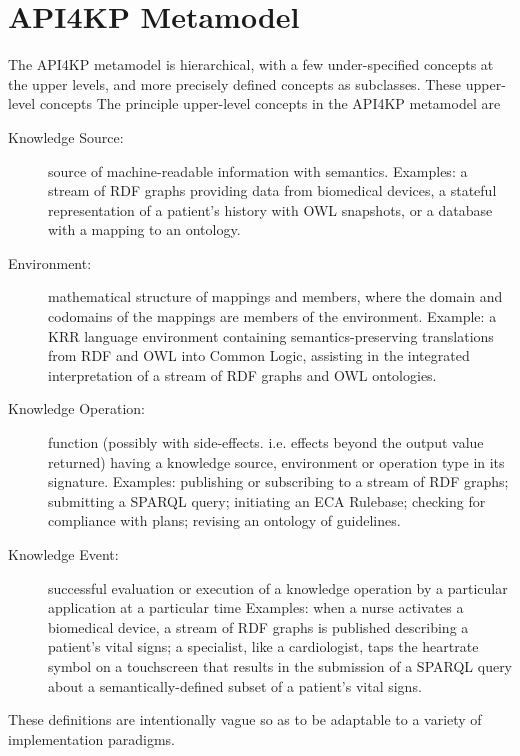 \documentclass[runningheads]{llncs}
\begin{document}
\section{API4KP Metamodel}
\label{sec:metamodel}
The API4KP metamodel is hierarchical, with a few under-specified concepts at the upper levels, and more precisely defined concepts as subclasses.
These upper-level concepts
The principle upper-level concepts in the API4KP metamodel are
\begin{description}
\item[Knowledge Source:] source of machine-readable information with semantics. Examples: a stream of RDF graphs providing data from biomedical devices, a stateful representation of a patient's history with OWL snapshots, or a database with a mapping to an ontology.
\item[Environment:] mathematical structure of mappings and members, where the domain and codomains of the mappings are members of the environment.  Example: a KRR language environment containing semantics-preserving translations from RDF and OWL into Common Logic, assisting in the integrated interpretation of a stream of RDF graphs and OWL ontologies.
\item[Knowledge Operation:] function (possibly with side-effects. i.e. effects beyond the output value returned) having a knowledge source, environment or operation type in its signature. Examples: 
 publishing or subscribing to a stream of RDF graphs;
 submitting a SPARQL query;
 initiating an ECA Rulebase;
 checking for compliance with plans;
 revising an ontology of guidelines.
\item[Knowledge Event:] 
successful evaluation or execution of a knowledge operation by a particular application at a particular time
Examples:
when a nurse activates a biomedical device, a stream of RDF graphs is published describing a patient's vital signs;
a specialist, like a cardiologist, taps the heartrate symbol on a touchscreen that results in the submission of a SPARQL query about a semantically-defined subset of a patient's vital signs.
\end{description}
These definitions are intentionally vague so as to be adaptable to a variety of implementation paradigms.
\end{document}
